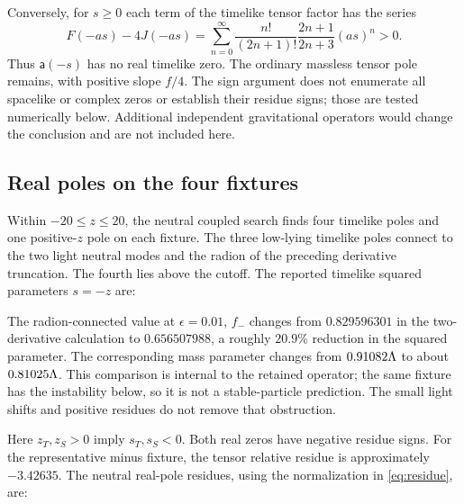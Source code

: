 Conversely, for $s\ge0$ each term of the timelike tensor factor has the series
\begin{equation}
 F(-as)-4J(-as)=
 \sum_{n=0}^{\infty}\frac{n!}{(2n+1)!}\frac{2n+1}{2n+3}(as)^n>0.\label{eq:positive}
\end{equation}
Thus $\mathsf a(-s)$ has no real timelike zero. The ordinary massless tensor pole remains, with positive slope $f/4$. The sign argument does not enumerate all spacelike or complex zeros or establish their residue signs; those are tested numerically below. Additional independent gravitational operators would change the conclusion and are not included here.

\subsection{Real poles on the four fixtures}

Within $-20\le z\le20$, the neutral coupled search finds four timelike poles and one positive-$z$ pole on each fixture. The three low-lying timelike poles connect to the two light neutral modes and the radion of the preceding derivative truncation. The fourth lies above the cutoff. The reported timelike squared parameters $s=-z$ are:

\begin{center}\small\TimelikeTable\end{center}

The radion-connected value at $\epsilon=0.01$, $f_-$ changes from $0.829596301$ in the two-derivative calculation to $0.656507988$, a roughly $20.9\%$ reduction in the squared parameter. The corresponding mass parameter changes from $0.91082\Lambda$ to about $0.81025\Lambda$. This comparison is internal to the retained operator; the same fixture has the instability below, so it is not a stable-particle prediction. The small light shifts and positive residues do not remove that obstruction.

\begin{center}\small\TachyonTable\end{center}

Here $z_T,z_S>0$ imply $s_T,s_S<0$. Both real zeros have negative residue signs. For the representative minus fixture, the tensor relative residue is approximately $-3.42635$. The neutral real-pole residues, using the normalization in \eqref{eq:residue}, are:
\begin{center}\small\ResidueTable\end{center}

